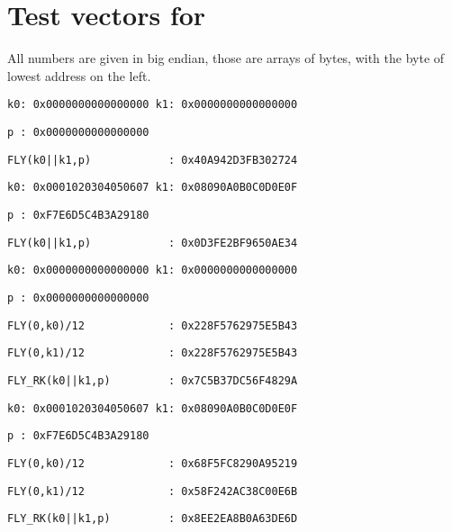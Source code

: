 \section{Test vectors for \fly}

All numbers are given in big endian, \ie those are arrays of bytes, with the byte of lowest address on the left.

\medskip

\noindent
\verb+k0: 0x0000000000000000 k1: 0x0000000000000000+

\noindent
\verb+p : 0x0000000000000000+

\noindent
\verb+FLY(k0||k1,p)            : 0x40A942D3FB302724+
 
\medskip

\noindent
\verb+k0: 0x0001020304050607 k1: 0x08090A0B0C0D0E0F+

\noindent
\verb+p : 0xF7E6D5C4B3A29180+

\noindent
\verb+FLY(k0||k1,p)            : 0x0D3FE2BF9650AE34+

\medskip

\noindent
\verb+k0: 0x0000000000000000 k1: 0x0000000000000000+

\noindent
\verb+p : 0x0000000000000000+

\noindent
\verb+FLY(0,k0)/12         	   : 0x228F5762975E5B43+

\noindent
\verb+FLY(0,k1)/12         	   : 0x228F5762975E5B43+

\noindent
\verb+FLY_RK(k0||k1,p)         : 0x7C5B37DC56F4829A+

\medskip

\noindent
\verb+k0: 0x0001020304050607 k1: 0x08090A0B0C0D0E0F+

\noindent
\verb+p : 0xF7E6D5C4B3A29180+

\noindent
\verb+FLY(0,k0)/12         	   : 0x68F5FC8290A95219+

\noindent
\verb+FLY(0,k1)/12         	   : 0x58F242AC38C00E6B+

\noindent
\verb+FLY_RK(k0||k1,p)         : 0x8EE2EA8B0A63DE6D+
